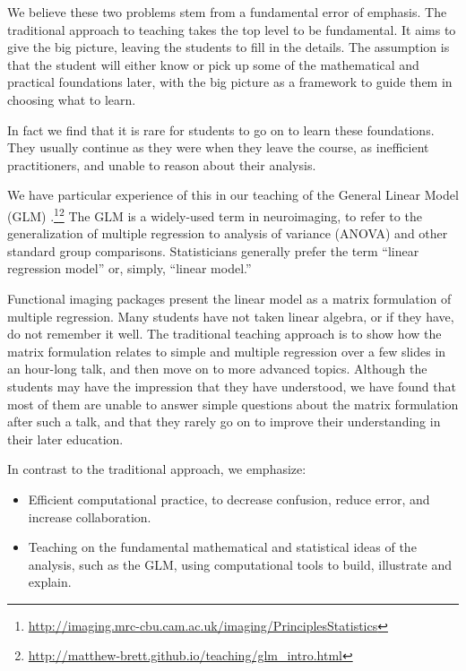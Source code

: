 We believe these two problems stem from a fundamental error of emphasis.
The traditional approach to teaching takes the top level to be fundamental.
It aims to give the big picture, leaving the students to fill in the details.
The assumption is that the student will either know or pick up some of the
mathematical and practical foundations later, with the big picture as a
framework to guide them in choosing what to learn.

In fact we find that it is rare for students to go on to learn these
foundations. They usually continue as they were when they leave the course, as
inefficient practitioners, and unable to reason about their analysis.

We have particular experience of this in our teaching of the General Linear
Model (GLM)
\citep{poline2012general}.\footnote{\url{http://imaging.mrc-cbu.cam.ac.uk/imaging/PrinciplesStatistics}}\footnote{\url{http://matthew-brett.github.io/teaching/glm_intro.html}\label{glm_intro}}
The GLM is a widely-used term in neuroimaging, to refer to the generalization
of multiple regression to analysis of variance (ANOVA) and other standard
group comparisons.  Statisticians generally prefer the term ``linear
regression model'' or, simply, ``linear model.''

Functional imaging packages present the linear model as a matrix formulation
of multiple regression.  Many students have not taken linear algebra, or if
they have, do not remember it well.  The traditional teaching approach is to
show how the matrix formulation relates to simple and multiple regression over
a few slides in an hour-long talk, and then move on to more advanced topics.
Although the students may have the impression that they have understood, we
have found that most of them are unable to answer simple questions about the
matrix formulation after such a talk, and that they rarely go on to improve
their understanding in their later education.


In contrast to the traditional approach, we emphasize:

\begin{itemize}

\item
    Efficient computational practice, to decrease confusion, reduce error, and
        increase collaboration.

\item
    Teaching on the fundamental mathematical and statistical ideas of the
        analysis, such as the GLM, using computational tools to build,
        illustrate and explain.

\end{itemize}

